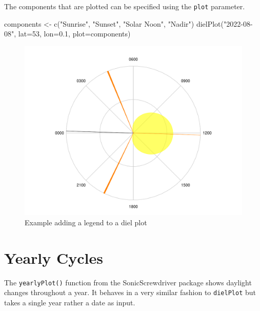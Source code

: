 \documentclass[
]{book}
\newenvironment{Shaded}{\begin{snugshade}}{\end{snugshade}}
\newcommand{\AttributeTok}[1]{\textcolor[rgb]{0.77,0.63,0.00}{#1}}
\newcommand{\DecValTok}[1]{\textcolor[rgb]{0.00,0.00,0.81}{#1}}
\newcommand{\FloatTok}[1]{\textcolor[rgb]{0.00,0.00,0.81}{#1}}
\newcommand{\FunctionTok}[1]{\textcolor[rgb]{0.00,0.00,0.00}{#1}}
\newcommand{\NormalTok}[1]{#1}
\newcommand{\OtherTok}[1]{\textcolor[rgb]{0.56,0.35,0.01}{#1}}
\newcommand{\StringTok}[1]{\textcolor[rgb]{0.31,0.60,0.02}{#1}}
\begin{document}
The components that are plotted can be specified using the \texttt{plot} parameter.

\begin{Shaded}
\begin{Highlighting}[]
\NormalTok{components }\OtherTok{\textless{}{-}} \FunctionTok{c}\NormalTok{(}\StringTok{"Sunrise"}\NormalTok{, }\StringTok{"Sunset"}\NormalTok{, }\StringTok{"Solar Noon"}\NormalTok{, }\StringTok{"Nadir"}\NormalTok{)}
\FunctionTok{dielPlot}\NormalTok{(}\StringTok{"2022{-}08{-}08"}\NormalTok{, }\AttributeTok{lat=}\DecValTok{53}\NormalTok{, }\AttributeTok{lon=}\FloatTok{0.1}\NormalTok{, }\AttributeTok{plot=}\NormalTok{components)}
\end{Highlighting}
\end{Shaded}

\begin{figure}

{\centering \includegraphics[width=0.9\linewidth]{_main_files/figure-latex/diel-plot-components-1} 

}

\caption{Example adding a legend to a diel plot}\label{fig:diel-plot-components}
\end{figure}

\hypertarget{yearly-cycles}{%
\section{Yearly Cycles}\label{yearly-cycles}}

The \texttt{yearlyPlot()} function from the SonicScrewdriver package shows daylight changes throughout a year. It behaves in a very similar fashion to \texttt{dielPlot} but takes a single year rather a date as input.
\end{document}
